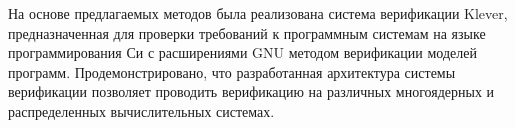 \documentclass[%
autoref,
colorlinks,  
facsimile,   %
]{disser}
\begin{document}
На основе предлагаемых методов была реализована система верификации Klever, предназначенная для проверки требований к программным системам на языке программирования Си с расширениями GNU методом верификации моделей программ.
Продемонстрировано, что разработанная архитектура системы верификации позволяет проводить верификацию на различных многоядерных и распределенных вычислительных системах.

\printbibliography[heading=authorcited,keyword={mypaper}, resetnumbers=true]

\end{document}
